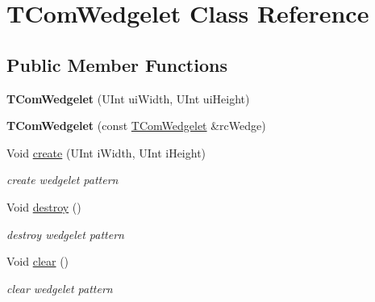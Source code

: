 \hypertarget{class_t_com_wedgelet}{}\section{T\+Com\+Wedgelet Class Reference}
\label{class_t_com_wedgelet}
\subsection*{Public Member Functions}
\begin{DoxyCompactItemize}
\item 
\mbox{\label{class_t_com_wedgelet_a0b7c458692ca8595ba3755902318ec66}} 
{\bfseries T\+Com\+Wedgelet} (U\+Int ui\+Width, U\+Int ui\+Height)
\item 
\mbox{\label{class_t_com_wedgelet_a9886ff15ae23f4debfdbcf90587fc182}} 
{\bfseries T\+Com\+Wedgelet} (const \hyperlink{class_t_com_wedgelet}{T\+Com\+Wedgelet} \&rc\+Wedge)
\item 
\mbox{\label{class_t_com_wedgelet_a3ccc1cc5db3e09d0aa8a0bf92ca569dc}} 
Void \hyperlink{class_t_com_wedgelet_a3ccc1cc5db3e09d0aa8a0bf92ca569dc}{create} (U\+Int i\+Width, U\+Int i\+Height)
\begin{DoxyCompactList}\small\item\em create wedgelet pattern \end{DoxyCompactList}\item 
\mbox{\label{class_t_com_wedgelet_a40e8ef4dce76ac1a46aabeb28418ace6}} 
Void \hyperlink{class_t_com_wedgelet_a40e8ef4dce76ac1a46aabeb28418ace6}{destroy} ()
\begin{DoxyCompactList}\small\item\em destroy wedgelet pattern \end{DoxyCompactList}\item 
\mbox{\label{class_t_com_wedgelet_a976ec6338d989225e93d4204f01bd444}} 
Void \hyperlink{class_t_com_wedgelet_a976ec6338d989225e93d4204f01bd444}{clear} ()
\begin{DoxyCompactList}\small\item\em clear wedgelet pattern \end{DoxyCompactList}\item 

\end{DoxyCompactItemize}
